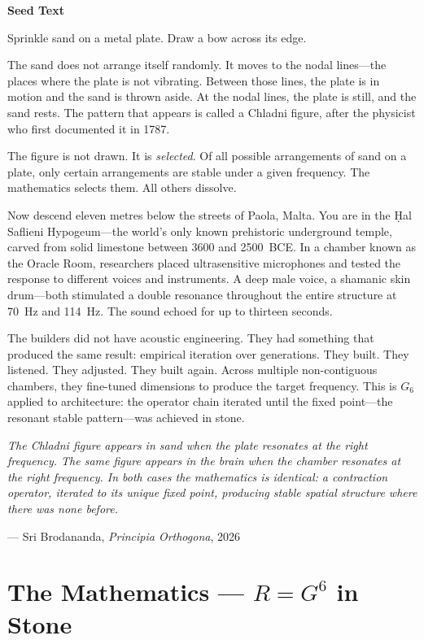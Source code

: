 \documentclass[11pt, twoside, openright]{book}
\theoremstyle{plain}
\theoremstyle{definition}
\newenvironment{seedbox}{%
  \begin{mdframed}[backgroundcolor=SeedBox,linecolor=PrincipiaDark!60,linewidth=0.5pt,innertopmargin=6pt,innerbottommargin=6pt]
  \noindent\textbf{Seed Text}\par\medskip}{\end{mdframed}}
\begin{document}
\begin{seedbox}
Sprinkle sand on a metal plate. Draw a bow across its edge.

The sand does not arrange itself randomly. It moves to the nodal
lines---the places where the plate is not vibrating. Between those
lines, the plate is in motion and the sand is thrown aside. At the
nodal lines, the plate is still, and the sand rests. The pattern that
appears is called a Chladni figure, after the physicist who first
documented it in 1787.

The figure is not drawn. It is \textit{selected}. Of all possible arrangements
of sand on a plate, only certain arrangements are stable under a given
frequency. The mathematics selects them. All others dissolve.

Now descend eleven metres below the streets of Paola, Malta. You are
in the \d{H}al Saflieni Hypogeum---the world's only known prehistoric
underground temple, carved from solid limestone between 3600 and
2500~BCE. In a chamber known as the Oracle Room, researchers placed
ultrasensitive microphones and tested the response to different voices
and instruments. A deep male voice, a shamanic skin drum---both
stimulated a double resonance throughout the entire structure at 70~Hz
and 114~Hz. The sound echoed for up to thirteen seconds.

The builders did not have acoustic engineering. They had something that
produced the same result: empirical iteration over generations. They
built. They listened. They adjusted. They built again. Across multiple
non-contiguous chambers, they fine-tuned dimensions to produce the
target frequency. This is $G_6$ applied to architecture: the operator
chain iterated until the fixed point---the resonant stable pattern---was
achieved in stone.

\textit{The Chladni figure appears in sand when the plate resonates at
the right frequency. The same figure appears in the brain when the
chamber resonates at the right frequency. In both cases the mathematics
is identical: a contraction operator, iterated to its unique fixed
point, producing stable spatial structure where there was none before.}

\begin{flushright}
--- Sri Brodananda, \textit{Principia Orthogona}, 2026
\end{flushright}
\end{seedbox}

\section{The Mathematics --- $R = G^6$ in Stone}
\end{document}
